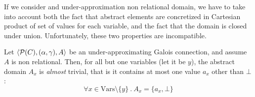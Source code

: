 If we consider and under-approximation non relational domain, we have to take into account both the fact that abstract elements are concretized in Cartesian product of set of values for each variable, and the fact that the domain is closed under union. Unfortunately, these two properties are incompatible.
\begin{prop}\label{ch4:th:underapprox-non-rel}
	Let $\langle \mathcal{P}(C), (\alpha, \gamma), A \rangle$ be an under-approximating Galois connection, and assume $A$ is non relational. Then, for all but one variables (let it be $y$), the abstract domain $A_x$ is \textit{almost} trivial, that is it contains at most one value $a_x$ other than $\bot$:
	\[
	\forall x \in \text{Vars} \setminus \{ y \} \ .\ A_x = \{ a_x, \bot \}
	\]
\end{prop}
\begin{figure}[!ht]
\end{figure}
